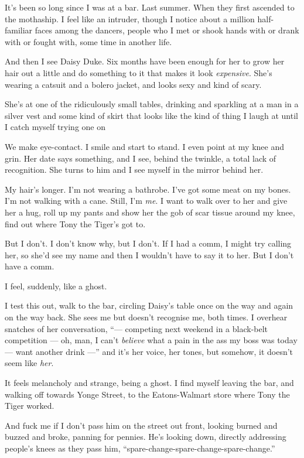 It's been so long since I was at a bar. Last summer. When they
first ascended to the mothaship. I feel like an intruder, though I
notice about a million half-familiar faces among the dancers,
people who I met or shook hands with or drank with or fought with,
some time in another life.

And then I see Daisy Duke. Six months have been enough for her to
grow her hair out a little and do something to it that makes it
look \emph{expensive}. She's wearing a catsuit and a bolero jacket,
and looks sexy and kind of scary.

She's at one of the ridiculously small tables, drinking and
sparkling at a man in a silver vest and some kind of skirt that
looks like the kind of thing I laugh at until I catch myself trying
one on

We make eye-contact. I smile and start to stand. I even point at my
knee and grin. Her date says something, and I see, behind the
twinkle, a total lack of recognition. She turns to him and I see
myself in the mirror behind her.

My hair's longer. I'm not wearing a bathrobe. I've got some meat on
my bones. I'm not walking with a cane. Still, I'm \emph{me}. I want
to walk over to her and give her a hug, roll up my pants and show
her the gob of scar tissue around my knee, find out where Tony the
Tiger's got to.

But I don't. I don't know why, but I don't. If I had a comm, I
might try calling her, so she'd see my name and then I wouldn't
have to say it to her. But I don't have a comm.

I feel, suddenly, like a ghost.

I test this out, walk to the bar, circling Daisy's table once on
the way and again on the way back. She sees me but doesn't
recognise me, both times. I overhear snatches of her conversation,
``--- competing next weekend in a black-belt competition --- oh, man, I can't 
\emph{believe} what a pain in the ass my boss was today --- want another drink 
---''
and it's her voice, her tones, but somehow, it doesn't seem like
\emph{her}.

It feels melancholy and strange, being a ghost. I find myself
leaving the bar, and walking off towards Yonge Street, to the
Eatons-Walmart store where Tony the Tiger worked.

And fuck me if I don't pass him on the street out front, looking
burned and buzzed and broke, panning for pennies. He's looking
down, directly addressing people's knees as they pass him,
``spare-change-spare-change-spare-change.''

